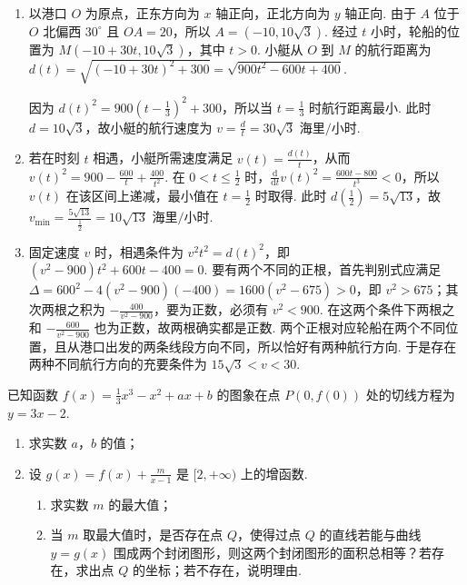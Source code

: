 \begin{solution}
\begin{enumerate}
\item 以港口 \(O\) 为原点，正东方向为 \(x\) 轴正向，正北方向为 \(y\) 轴正向. 由于 \(A\) 位于 \(O\) 北偏西 \(30^\circ\) 且 \(OA=20\)，所以 \(A=(-10,10\sqrt{3})\). 经过 \(t\) 小时，轮船的位置为 \(M\left(-10+30t,10\sqrt{3}\right)\)，其中 \(t>0\). 小艇从 \(O\) 到 \(M\) 的航行距离为 \(d(t)=\sqrt{\left(-10+30t\right)^2+300}=\sqrt{900t^2-600t+400}\).

因为 \(d(t)^2=900\left(t-\frac{1}{3}\right)^2+300\)，所以当 \(t=\frac{1}{3}\) 时航行距离最小. 此时 \(d=10\sqrt{3}\)，故小艇的航行速度为 \(v=\frac{d}{t}=30\sqrt{3}\text{ 海里/小时}\).
\item 若在时刻 \(t\) 相遇，小艇所需速度满足 \(v(t)=\frac{d(t)}{t}\)，从而 \(v(t)^2=900-\frac{600}{t}+\frac{400}{t^2}\). 在 \(0<t\leqslant\frac{1}{2}\) 时，\(\frac{\mathrm d}{\mathrm dt}v(t)^2=\frac{600t-800}{t^3}<0\)，所以 \(v(t)\) 在该区间上递减，最小值在 \(t=\frac{1}{2}\) 时取得. 此时 \(d\left(\frac{1}{2}\right)=5\sqrt{13}\)，故 \(v_{\min}=\frac{5\sqrt{13}}{\frac{1}{2}}=10\sqrt{13}\text{ 海里/小时}\).
\item 固定速度 \(v\) 时，相遇条件为 \(v^2t^2=d(t)^2\)，即 \(\left(v^2-900\right)t^2+600t-400=0\). 要有两个不同的正根，首先判别式应满足 \(\Delta=600^2-4\left(v^2-900\right)(-400)=1600\left(v^2-675\right)>0\)，即 \(v^2>675\)；其次两根之积为 \(-\frac{400}{v^2-900}\)，要为正数，必须有 \(v^2<900\). 在这两个条件下两根之和 \(-\frac{600}{v^2-900}\) 也为正数，故两根确实都是正数. 两个正根对应轮船在两个不同位置，且从港口出发的两条线段方向不同，所以恰好有两种航行方向. 于是存在两种不同航行方向的充要条件为 \(15\sqrt{3}<v<30\).
\end{enumerate}
\end{solution}

\begin{problem}
已知函数 \( f(x) = \frac{1}{3}x^3 - x^2 + ax + b \) 的图象在点 \( P(0, f(0)) \) 处的切线方程为 \( y = 3x - 2 \).

\begin{enumerate}
\item 求实数 \(a\)，\(b\) 的值；
\item 设 \( g(x) = f(x) + \frac{m}{x - 1} \) 是 \([2, +\infty)\) 上的增函数.
\begin{enumerate}
\item 求实数 \(m\) 的最大值；
\item 当 \(m\) 取最大值时，是否存在点 \(Q\)，使得过点 \(Q\) 的直线若能与曲线 \(y = g(x)\) 围成两个封闭图形，则这两个封闭图形的面积总相等？若存在，求出点 \(Q\) 的坐标；若不存在，说明理由.
\end{enumerate}
\end{enumerate}
\end{problem}

